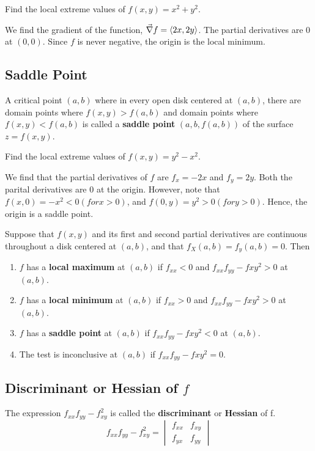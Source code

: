 \begin{example}
    \normalfont Find the local extreme values of $f(x, y) = x^2 + y^2$.

    We find the gradient of the function, $\vec{\nabla} f = \langle 2x, 2y \rangle$. The partial derivatives are 0 at $(0, 0)$.
    Since $f$ is never negative, the origin is the local minimum.
\end{example}


\subsection{Saddle Point}
A critical point $(a, b)$ where in every open disk centered at $(a, b)$, there are domain points where $f(x, y) > f(a, b)$
and domain points where $f(x, y) < f(a, b)$ is called a \textbf{saddle point} $(a, b, f(a, b))$ of the surface
$z = f(x, y)$.

\begin{example}
    \normalfont Find the local extreme values of $f(x, y) = y^2 - x^2$.

    We find that the partial derivatives of $f$ are $f_x = -2x$ and $f_y = 2y$. Both the parital derivatives are 0 at the origin.
    However, note that $f(x, 0) = -x^2 < 0 (for x > 0)$, and $f(0, y) = y^2 > 0 (for y > 0)$. Hence, the origin is a saddle point.
\end{example}

\begin{theorem}
    Suppose that $f(x, y)$ and its first and second partial derivatives are continuous throughout a disk centered at $(a, b)$, and
    that $f_X(a, b) = f_y(a, b) = 0$. Then
    \begin{enumerate}
        \item $f$ has a \textbf{local maximum} at $(a, b)$ if $f_{xx} < 0$ and $f_{xx}f_{yy} - f{xy}^2 > 0$ at $(a, b)$.
        \item $f$ has a \textbf{local minimum} at $(a, b)$ if $f_{xx} > 0$ and $f_{xx}f_{yy} - f{xy}^2 > 0$ at $(a, b)$.
        \item $f$ has a \textbf{saddle point} at $(a, b)$ if $f_{xx}f_{yy} - f{xy}^2 < 0$ at $(a, b)$.
        \item The test is inconclusive at $(a, b)$ if $f_{xx}f_{yy} - f{xy}^2 = 0$.
    \end{enumerate}
\end{theorem}


\subsection{Discriminant or Hessian of \texorpdfstring{$f$}{f}}
The expression $f_{xx}f_{yy} - f_{xy}^2$ is called the \textbf{discriminant} or \textbf{Hessian} of f.
\begin{equation}
    f_{xx}f_{yy} - f_{xy}^2 =
    \begin{vmatrix}
        f_{xx} & f_{xy} \\ f_{yx} & f_{yy}
    \end{vmatrix}
\end{equation}

